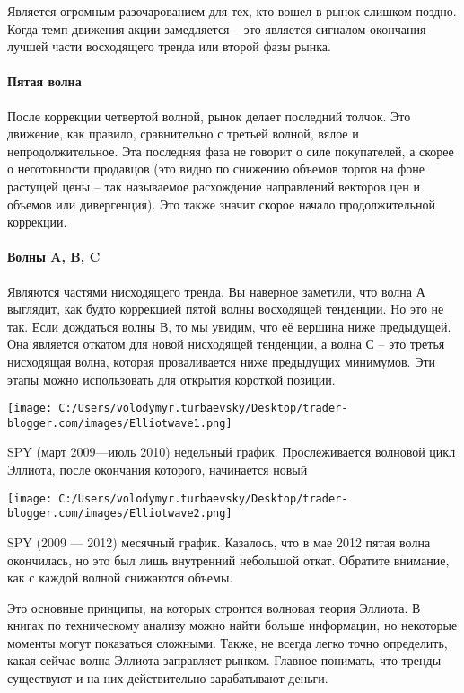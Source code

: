 \documentclass[a5paper]{article}
\begin{document}
Является огромным разочарованием для тех, кто вошел в рынок слишком
поздно. Когда темп движения акции замедляется – это является сигналом
окончания лучшей части восходящего тренда или второй фазы рынка.

\paragraph{Пятая волна }

После коррекции четвертой волной, рынок делает последний толчок. Это
движение, как правило, сравнительно с третьей волной, вялое и
непродолжительное. Эта последняя фаза не говорит о силе покупателей, а
скорее о неготовности продавцов (это видно по снижению объемов торгов
на фоне растущей цены – так называемое расхождение направлений
векторов цен и объемов или дивергенция). Это также значит скорое
начало продолжительной коррекции.

\paragraph{Волны A, B, C}

Являются частями нисходящего тренда. Вы наверное заметили, что волна А
выглядит, как будто коррекцией пятой волны восходящей тенденции. Но
это не так. Если дождаться волны В, то мы увидим, что её вершина ниже
предыдущей. Она является откатом для новой нисходящей тенденции, а
волна С – это третья нисходящая волна, которая проваливается ниже
предыдущих минимумов. Эти этапы можно использовать для открытия
короткой позиции.

\texttt{[image: C:/Users/volodymyr.turbaevsky/Desktop/trader-blogger.com/images/Elliotwave1.png]}

SPY (март 2009—июль 2010) недельный график. Прослеживается волновой
цикл Эллиота, после окончания которого, начинается новый

\texttt{[image: C:/Users/volodymyr.turbaevsky/Desktop/trader-blogger.com/images/Elliotwave2.png]}

SPY (2009 — 2012) месячный график. Казалось, что в мае 2012 пятая волна окончилась, но это был лишь внутренний небольшой откат. Обратите внимание, как с каждой волной снижаются объемы.

Это основные принципы, на которых строится волновая теория Эллиота. В книгах по техническому анализу можно найти больше информации, но некоторые моменты могут показаться сложными. Также, не всегда легко точно определить, какая сейчас волна Эллиота заправляет рынком. Главное понимать, что тренды существуют и на них действительно зарабатывают деньги.
\end{document}
